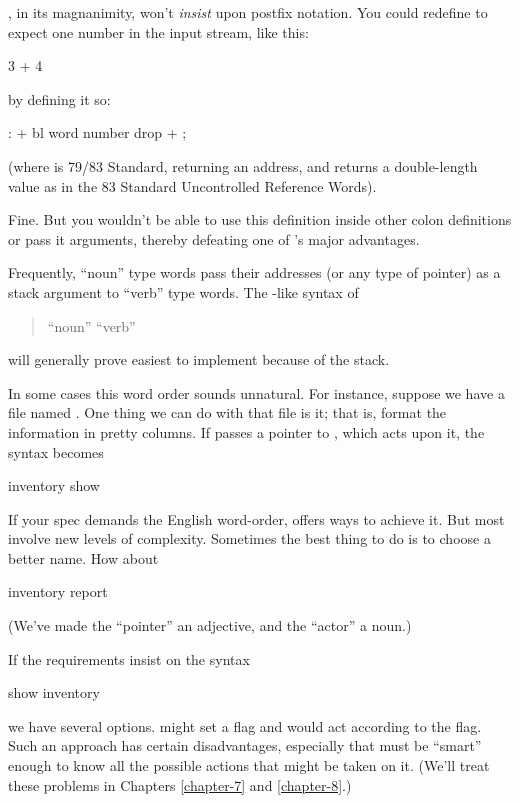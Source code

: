 \Forth{}, in its magnanimity, won't \emph{insist} upon postfix notation.
You could redefine \forth{+} to expect one number in the input stream,
like this:

\begin{Code}
3 + 4
\end{Code}
by defining it so:
\begin{Code}
: +   bl word  number drop  + ;
\end{Code}
(where  is 79/83 Standard, returning an address, and
 returns a double-length value as in the 83 Standard
Uncontrolled Reference Words).

Fine. But you wouldn't be able to use this definition inside other colon
definitions or pass it arguments, thereby defeating one of \Forth{}'s
major advantages.

Frequently, ``noun'' type words pass their addresses (or any type of
pointer) as a stack argument to ``verb'' type words. The \Forth{}-like
syntax of
\begin{quote}
{\sf ``noun'' ``verb''}
\end{quote}
will generally prove easiest to implement because of the stack.\medbreak

In some cases this word order sounds
unnatural.  For instance, suppose we have a file named
. One thing we can do with that file is 
it; that is, format the information in pretty columns. If
 passes a pointer to , which acts upon
it, the syntax becomes
\begin{Code}
inventory show
\end{Code}
If your spec demands the English word-order,
\Forth{} offers ways to
achieve it. But most involve new levels of complexity. Sometimes the
best thing to do is to choose a better name. How about
\begin{Code}
inventory report
\end{Code}
(We've made the ``pointer'' an adjective, and the ``actor'' a noun.)

If the requirements insist on the syntax
\begin{Code}
show inventory
\end{Code}
we have several options.  might set a flag and
 would act according to the flag. Such an approach has
certain disadvantages, especially that  must be ``smart''
enough to know all the possible actions that might be taken on it. (We'll
treat these problems in Chapters \ref{chapter-7} and \ref{chapter-8}.)%

